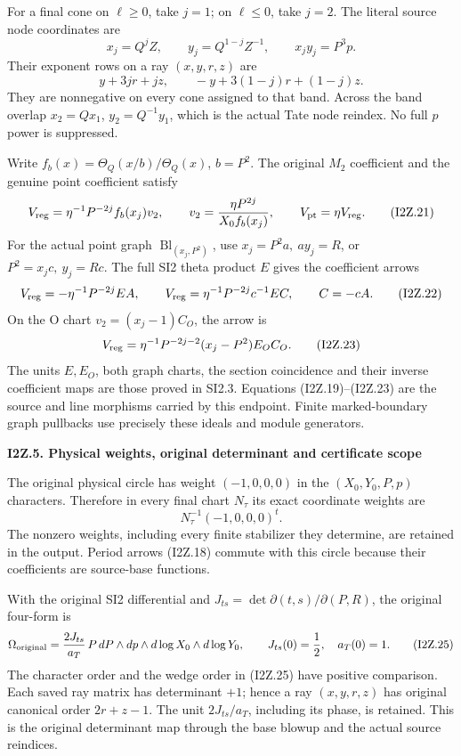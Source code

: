 For a final cone on \(\ell\ge0\), take \(j=1\); on \(\ell\le0\),
take \(j=2\). The literal source node coordinates are
\[
 x_j=Q^j Z,\qquad y_j=Q^{1-j}Z^{-1},\qquad x_jy_j=P^3p .
 \tag{I2Z.19}
\]
Their exponent rows on a ray \((x,y,r,z)\) are
\[
 y+3jr+jz,\qquad -y+3(1-j)r+(1-j)z.
 \tag{I2Z.20}
\]
They are nonnegative on every cone assigned to that band. Across
the band overlap \(x_2=Qx_1\), \(y_2=Q^{-1}y_1\), which is the actual
Tate node reindex. No full \(p\) power is suppressed.

Write \(f_b(x)=\Theta_Q(x/b)/\Theta_Q(x)\), \(b=P^2\).
The original \(M_{2}\) coefficient and the genuine point coefficient satisfy
\[
 V_{\rm reg}=\eta^{-1}P^{-2j}f_b(x_j)v_2,\qquad
 v_2=\frac{\eta P^{2j}}{X_0f_b(x_j)},\qquad
 V_{\rm pt}=\eta V_{\rm reg}.
 \tag{I2Z.21}
\]
For the actual point graph \(\operatorname{Bl}_{(x_j,P^2)}\), use
\(x_j=P^2a,\ ay_j=R\), or \(P^2=x_jc,\ y_j=Rc\).
The full SI2 theta product \(E\) gives the coefficient arrows
\[
 V_{\rm reg}=-\eta^{-1}P^{-2j}EA,\qquad
 V_{\rm reg}=\eta^{-1}P^{-2j}c^{-1}EC,\qquad C=-cA.
 \tag{I2Z.22}
\]
On the O chart \(v_2=(x_j-1)C_O\), the arrow is
\[
 V_{\rm reg}=\eta^{-1}P^{-2j-2}(x_j-P^2)E_O C_O .
 \tag{I2Z.23}
\]
The units \(E,E_O\), both graph charts, the section coincidence and
their inverse coefficient maps are those proved in SI2.3. Equations
(I2Z.19)--(I2Z.23) are the source and line morphisms carried by this
endpoint. Finite marked-boundary graph pullbacks use precisely these
ideals and module generators.

\par

\medskip\noindent\textbf{I2Z.5. Physical weights, original determinant and certificate scope}

\par\nobreak

The original physical circle has weight
\((-1,0,0,0)\) in the \((X_0,Y_0,P,p)\) characters. Therefore in
every final chart \(N_\tau\) its exact coordinate weights are
\[
 N_\tau^{-1}(-1,0,0,0)^t.
 \tag{I2Z.24}
\]
The nonzero weights, including every finite stabilizer they determine,
are retained in the output. Period arrows (I2Z.18) commute with this
circle because their coefficients are source-base functions.

With the original SI2 differential and
\(J_{ts}=\det\partial(t,s)/\partial(P,R)\), the original four-form is
\[
 \Omega_{\rm original}
 =\frac{2J_{ts}}{a_T}\,
 P\,dP\wedge dp\wedge d\log X_0\wedge d\log Y_0,\qquad
 J_{ts}(0)=\frac12,\quad a_T(0)=1 .
 \tag{I2Z.25}
\]
The character order and the wedge order in (I2Z.25) have positive
comparison. Each saved ray matrix has determinant \(+1\); hence a
ray \((x,y,r,z)\) has original canonical order \(2r+z-1\).
The unit \(2J_{ts}/a_T\), including its phase, is retained. This is
the original determinant map through the base blowup and the actual
source reindices.

